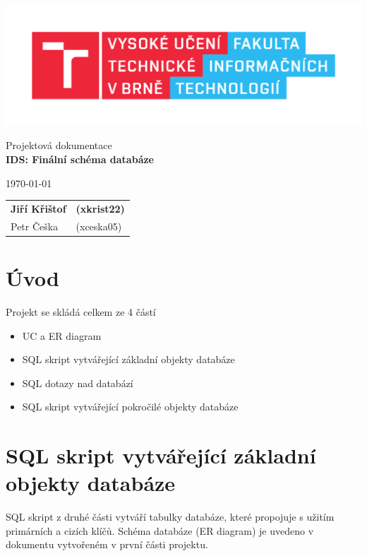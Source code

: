 \documentclass[a4paper, 11pt]{article}
\begin{document}
	\begin{titlepage}
		\begin{center}
			\includegraphics[width=0.77\linewidth]{pics/FIT_logo.pdf} \\


			\Huge{Projektová dokumentace} \\
			\LARGE{\textbf{IDS: Finální schéma databáze }} \\
		\end{center}

		\begin{minipage}{0.4 \textwidth}
			{\Large \today}
		\end{minipage}
		\hfill
		\Large
		\begin{tabular}{l l}
			\textbf{Jiří Křištof} & \textbf{(xkrist22)} \\
			Petr Češka & (xceska05) \\
		\end{tabular}
	\end{titlepage}
	\newpage
	
\section{Úvod}
Projekt se skládá celkem ze 4 částí

\begin{itemize}
	\item UC a ER diagram
	\item SQL skript vytvářející základní objekty databáze
	\item SQL dotazy nad databází
	\item SQL skript vytvářející pokročilé objekty databáze
\end{itemize}

\section{SQL skript vytvářející základní objekty databáze}
SQL skript z druhé části vytváří tabulky databáze, které propojuje s užitím primárních a cizích klíčů. Schéma databáze (ER diagram) je uvedeno v dokumentu vytvořeném v první části projektu.
\end{document}
